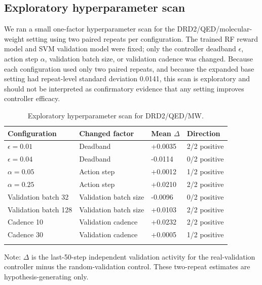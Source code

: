 \documentclass[referee,lineno,pdflatex,sn-basic]{sn-jnl}
\theoremstyle{thmstyleone}%
\theoremstyle{thmstyletwo}%
\theoremstyle{thmstylethree}%
\begin{document}
\begin{appendices}

\section{Exploratory hyperparameter scan}\label{app:hyperparam}

We ran a small one-factor hyperparameter scan for the DRD2/QED/molecular-weight setting using two paired repeats per configuration. The trained RF reward model and SVM validation model were fixed; only the controller deadband $\epsilon$, action step $\alpha$, validation batch size, or validation cadence was changed. Because each configuration used only two paired repeats, and because the expanded base setting had repeat-level standard deviation 0.0141, this scan is exploratory and should not be interpreted as confirmatory evidence that any setting improves controller efficacy.

\begin{table}[h]
\caption{Exploratory hyperparameter scan for DRD2/QED/MW.}
\label{tab:hyperparam_scan}
\centering
\footnotesize
\setlength{\tabcolsep}{4pt}
\renewcommand{\arraystretch}{1.15}
\begin{tabular}{@{}llll@{}}
\toprule
Configuration & Changed factor & Mean $\Delta$ & Direction\\
\midrule
$\epsilon=0.01$ & Deadband & +0.0035 & 2/2 positive\\
$\epsilon=0.04$ & Deadband & -0.0114 & 0/2 positive\\
$\alpha=0.05$ & Action step & +0.0012 & 1/2 positive\\
$\alpha=0.25$ & Action step & +0.0210 & 2/2 positive\\
Validation batch 32 & Validation batch size & -0.0096 & 0/2 positive\\
Validation batch 128 & Validation batch size & +0.0103 & 2/2 positive\\
Cadence 10 & Validation cadence & +0.0232 & 2/2 positive\\
Cadence 30 & Validation cadence & +0.0005 & 1/2 positive\\
\botrule
\end{tabular}

\vspace{2pt}
\raggedright
\footnotesize
Note: $\Delta$ is the last-50-step independent validation activity for the real-validation controller minus the random-validation control. These two-repeat estimates are hypothesis-generating only.
\end{table}

\end{appendices}
\end{document}
